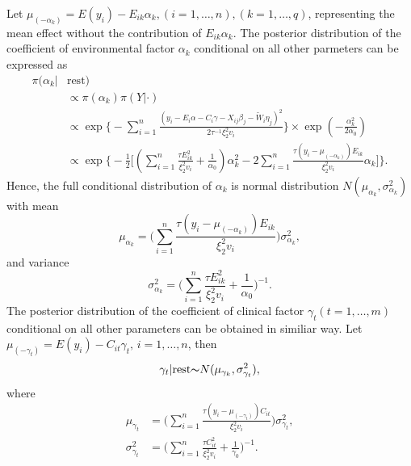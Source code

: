 \documentclass[12pt]{article}
\begin{document}
Let $\mu_{(-\alpha_k)}=E(y_i)-E_{ik}\alpha_k, (i=1,\dots,n), (k=1,\dots,q)$, representing the mean effect without the contribution of $E_{ik}\alpha_k$. The posterior distribution of the coefficient of environmental factor $\alpha_k$ conditional on all other parmeters can be expressed as
\begin{equation*}\label{equr:full}
\begin{aligned}
\pi(\alpha_k|& \text{rest}) \\
& \propto \pi(\alpha_k)\pi(Y|\cdot) \\
& \propto \exp\Big\{- \sum_{i=1}^{n}\frac{(y_i - E_i \alpha - C_i \gamma - X_{ij}\beta_{j} - \tilde{W}_{i}\eta_{j})^2}{2 \tau^{-1} \xi_{2}^{2} v_i} \Big\}
 \times\exp(-\frac{\alpha_{k}^2}{2 \alpha_0})\\
& \propto \exp\Big\{ -\frac{1}{2}\big[(\sum_{i=1}^{n} \frac{\tau E_{ik}^{2}}{\xi_{2}^{2} v_i}+\frac{1}{\alpha_0})\alpha_k^2 - 2\sum_{i=1}^{n}\frac{\tau(y_i-\mu_{(-\alpha_k)})E_{ik}}{\xi_2^2 v_i}\alpha_k\big]\Big\}.
\end{aligned}
\end{equation*}
Hence, the full conditional distribution of $\alpha_k$ is normal distribution $N(\mu_{\alpha_k}, \sigma_{\alpha_k}^{2})$with mean
\begin{equation*}\label{equr:meanm}
\mu_{\alpha_k} = \big(\sum_{i=1}^{n}\frac{\tau(y_i-\mu_{(-\alpha_k)})E_{ik}}{\xi_2^2 v_i}\big)\sigma_{\alpha_k}^2,
\end{equation*}
and variance
\begin{equation*}\label{equr:meanm}
\sigma_{\alpha_k}^{2} = \big( \sum_{i=1}^{n} \frac{\tau E_{ik}^2}{\xi_2^2 v_i}+\frac{1}{\alpha_0}\big)^{-1}.
\end{equation*}
The posterior distribution of the coefficient of clinical factor $\gamma_t (t=1,\dots,m)$ conditional on all other parameters can be obtained in similiar way. Let $\mu_{(-\gamma_t)}=E(y_i)-C_{it}\gamma_t,\, i=1,\dots,n$, then
\begin{equation*}\label{equr:meanm}
\gamma_t| \text{rest} {\thicksim} N(\mu_{\gamma_k}, \sigma_{\gamma_t}^{2}),
\end{equation*}
where 
\begin{equation*}\label{equr:meanm}
\begin{aligned}
\mu_{\gamma_t} &= \big(\sum_{i=1}^{n}\frac{\tau(y_i-\mu_{(-\gamma_t)})C_{it}}{\xi_2^2 v_i}\big)\sigma_{\gamma_t}^2,\\
\sigma_{\gamma_t}^{2} &= \big( \sum_{i=1}^{n} \frac{\tau C_{it}^2}{\xi_2^2 v_i}+\frac{1}{\gamma_0}\big)^{-1}.
\end{aligned}
\end{equation*}
\end{document}
